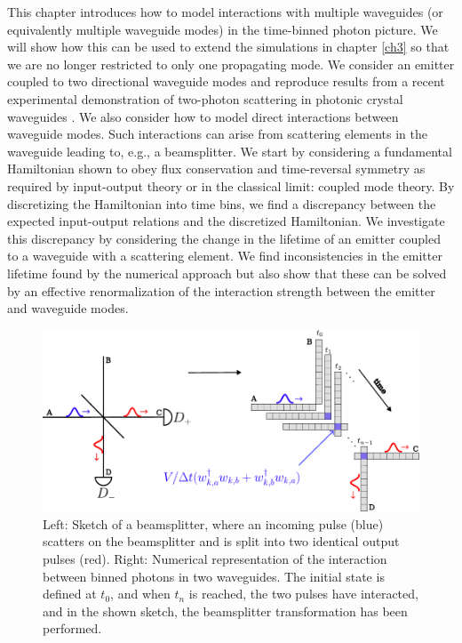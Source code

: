This chapter introduces how to model interactions with multiple waveguides (or equivalently multiple waveguide modes) in the time-binned photon picture. We will show how this can be used to extend the simulations in chapter \ref{ch3} so that we are no longer restricted to only one propagating mode. We consider an emitter coupled to two directional waveguide modes and reproduce results from a recent experimental demonstration of two-photon scattering in photonic crystal waveguides \cite{LeJeannic2022DynamicalEmitter}. We also consider how to model direct interactions between waveguide modes. Such interactions can arise from scattering elements in the waveguide leading to, e.g., a beamsplitter. We start by considering a fundamental Hamiltonian shown to obey flux conservation and time-reversal symmetry as required by input-output theory or in the classical limit: coupled mode theory. By discretizing the Hamiltonian into time bins, we find a discrepancy between the expected input-output relations and the discretized Hamiltonian. We investigate this discrepancy by considering the change in the lifetime of an emitter coupled to a waveguide with a scattering element. We find inconsistencies in the emitter lifetime found by the numerical approach but also show that these can be solved by an effective renormalization of the interaction strength between the emitter and waveguide modes. 
\begin{figure}[H]
    \centering
    \includegraphics[width = \linewidth]{figures/waveguideinteraciton.pdf}
    \caption{Left: Sketch of a beamsplitter, where an incoming pulse (blue) scatters on the beamsplitter and is split into two identical output pulses (red). Right: Numerical representation of the interaction between binned photons in two waveguides. The initial state is defined at $t_0$, and when $t_n$ is reached, the two pulses have interacted, and in the shown sketch, the beamsplitter transformation has been performed. }
    \label{fig:beamsplitter_illustration}
\end{figure}


